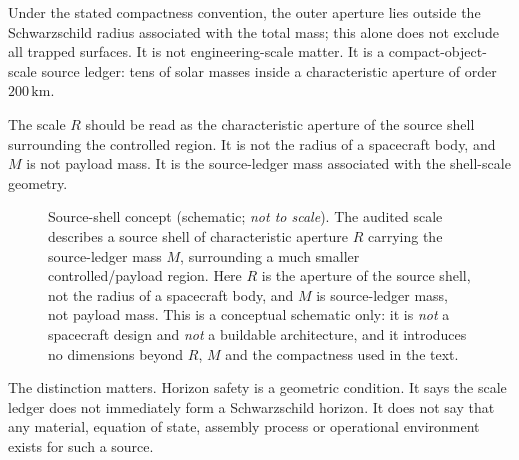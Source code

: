 \documentclass[11pt,a4paper]{article}
\begin{document}
Under the stated compactness convention, the outer aperture lies outside the Schwarzschild radius associated with the total mass; this alone does not exclude all trapped surfaces. It is not engineering-scale matter. It is a compact-object-scale source ledger: tens of solar masses inside a characteristic aperture of order $200\,\mathrm{km}$.

The scale $R$ should be read as the characteristic aperture of the source shell surrounding the controlled region. It is not the radius of a spacecraft body, and $M$ is not payload mass. It is the source-ledger mass associated with the shell-scale geometry.

\begin{figure}[ht]
\centering
{}
\caption{Source-shell concept (schematic; \emph{not to scale}). The audited scale describes a source shell of characteristic aperture $R$ carrying the source-ledger mass $M$, surrounding a much smaller controlled/payload region. Here $R$ is the aperture of the source shell, not the radius of a spacecraft body, and $M$ is source-ledger mass, not payload mass. This is a conceptual schematic only: it is \emph{not} a spacecraft design and \emph{not} a buildable architecture, and it introduces no dimensions beyond $R$, $M$ and the compactness used in the text.}
\label{fig:source-shell}
\end{figure}

The distinction matters. Horizon safety is a geometric condition. It says the scale ledger does not immediately form a Schwarzschild horizon. It does not say that any material, equation of state, assembly process or operational environment exists for such a source.
\end{document}
